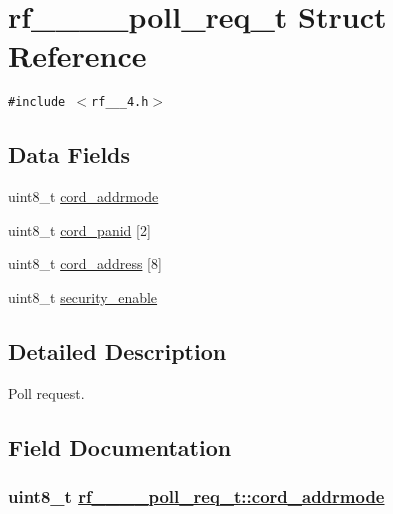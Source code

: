 \hypertarget{structrf__802__15__4__poll__req__t}{
\section{rf\_\_\_\_\-poll\_\-req\_\-t Struct Reference}
\label{structrf__802__15__4__poll__req__t}
}
{\tt \#include $<$rf\_\_\_\-4.h$>$}

\subsection*{Data Fields}
\begin{CompactItemize}
\item 
uint8\_\-t \hyperlink{structrf__802__15__4__poll__req__t_d8834b23b3a47d6183c90e1f2bf2bbf0}{cord\_\-addrmode}
\item 
uint8\_\-t \hyperlink{structrf__802__15__4__poll__req__t_9d3a01a8f05572f8d05984c79ca61648}{cord\_\-panid} \mbox{[}2\mbox{]}
\item 
uint8\_\-t \hyperlink{structrf__802__15__4__poll__req__t_705d43433da57f0838952b04bbedba91}{cord\_\-address} \mbox{[}8\mbox{]}
\item 
uint8\_\-t \hyperlink{structrf__802__15__4__poll__req__t_45a257887c33a9ab4551e27237f8c848}{security\_\-enable}
\end{CompactItemize}


\subsection{Detailed Description}
Poll request. 



\subsection{Field Documentation}
\hypertarget{structrf__802__15__4__poll__req__t_d8834b23b3a47d6183c90e1f2bf2bbf0}{
\subsubsection[cord\_\-addrmode]{\setlength{\rightskip}{0pt plus 5cm}uint8\_\-t \hyperlink{structrf__802__15__4__poll__req__t_d8834b23b3a47d6183c90e1f2bf2bbf0}{rf\_\_\_\_\-poll\_\-req\_\-t::cord\_\-addrmode}}}
\label{structrf__802__15__4__poll__req__t_d8834b23b3a47d6183c90e1f2bf2bbf0}


